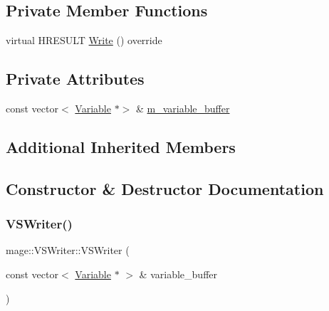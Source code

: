 \subsection*{Private Member Functions}
\begin{DoxyCompactItemize}
\item 
virtual H\+R\+E\+S\+U\+LT \hyperlink{classmage_1_1_v_s_writer_a1d106607f69bbd5989a259bbf60262fb}{Write} () override
\end{DoxyCompactItemize}
\subsection*{Private Attributes}
\begin{DoxyCompactItemize}
\item 
const vector$<$ \hyperlink{structmage_1_1_variable}{Variable} $\ast$$>$ \& \hyperlink{classmage_1_1_v_s_writer_a4fa655fa7c7d09a9439a22061ceab0f4}{m\+\_\+variable\+\_\+buffer}
\end{DoxyCompactItemize}
\subsection*{Additional Inherited Members}


\subsection{Constructor \& Destructor Documentation}
\hypertarget{classmage_1_1_v_s_writer_a401e3661cf197c20a011792221443e8f}{}\label{classmage_1_1_v_s_writer_a401e3661cf197c20a011792221443e8f} 
\subsubsection{\texorpdfstring{V\+S\+Writer()}{VSWriter()}\hspace{0.1cm}{\footnotesize\ttfamily [1/3]}}
{\footnotesize\ttfamily mage\+::\+V\+S\+Writer\+::\+V\+S\+Writer (\begin{DoxyParamCaption}\item[{const vector$<$ \hyperlink{structmage_1_1_variable}{Variable} $\ast$ $>$ \&}]{variable\+\_\+buffer }\end{DoxyParamCaption})\hspace{0.3cm}{\ttfamily [explicit]}}

\hypertarget{classmage_1_1_v_s_writer_ac832695702725d55e8b5ded2917758d9}{}\label{classmage_1_1_v_s_writer_ac832695702725d55e8b5ded2917758d9} 
